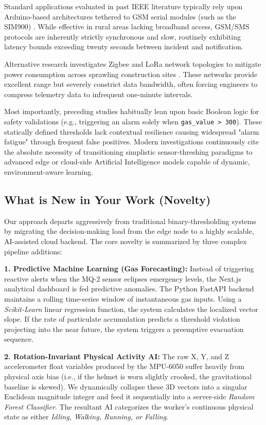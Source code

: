 \documentclass[11pt, conference, a4paper]{IEEEtran}
\begin{document}
Standard applications evaluated in past IEEE literature typically rely upon Arduino-based architectures tethered to GSM serial modules (such as the SIM900) \cite{Author1}. While effective in rural areas lacking broadband access, GSM/SMS protocols are inherently strictly synchronous and slow, routinely exhibiting latency bounds exceeding twenty seconds between incident and notification.

Alternative research investigates Zigbee and LoRa network topologies to mitigate power consumption across sprawling construction sites \cite{Author2}. These networks provide excellent range but severely constrict data bandwidth, often forcing engineers to compress telemetry data to infrequent one-minute intervals. 

Most importantly, preceding studies habitually lean upon basic Boolean logic for safety validations (e.g., triggering an alarm solely when \texttt{gas\_value > 300}). These statically defined thresholds lack contextual resilience causing widespread "alarm fatigue" through frequent false positives. Modern investigations continuously cite the absolute necessity of transitioning simplistic sensor-threshing paradigms to advanced edge or cloud-side Artificial Intelligence models capable of dynamic, environment-aware learning.

\subsection{What is New in Your Work (Novelty)}
Our approach departs aggressively from traditional binary-thresholding systems by migrating the decision-making load from the edge node to a highly scalable, AI-assisted cloud backend. The core novelty is summarized by three complex pipeline additions:

\textbf{1. Predictive Machine Learning (Gas Forecasting):} Instead of triggering reactive alerts when the MQ-2 sensor eclipses emergency levels, the Next.js analytical dashboard is fed predictive anomalies. The Python FastAPI backend maintains a rolling time-series window of instantaneous gas inputs. Using a \textit{Scikit-Learn} linear regression function, the system calculates the localized vector slope. If the rate of particulate accumulation predicts a threshold violation projecting into the near future, the system triggers a preemptive evacuation sequence.

\textbf{2. Rotation-Invariant Physical Activity AI:} The raw X, Y, and Z accelerometer float variables produced by the MPU-6050 suffer heavily from physical axis bias (i.e., if the helmet is worn slightly crooked, the gravitational baseline is skewed). We dynamically collapse these 3D vectors into a singular Euclidean magnitude integer and feed it sequentially into a server-side \textit{Random Forest Classifier}. The resultant AI categorizes the worker's continuous physical state as either \textit{Idling, Walking, Running, or Falling}.
\end{document}
